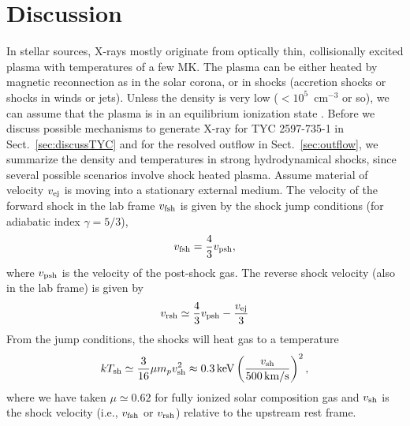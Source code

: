 \documentclass[linenumbers]{aastex631}
\newcommand{\be}{\begin{equation}}
\newcommand{\ee}{\end{equation}}
\begin{document}
\section{Discussion}  \label{sec:discussion}
In stellar sources, X-rays mostly originate from optically thin, collisionally excited plasma with temperatures of a few MK. The plasma can be either heated by magnetic reconnection as in the solar corona, or in shocks (accretion shocks or shocks in winds or jets). Unless the density is very low ($<10^5$~cm$^{-3}$ or so), we can assume that the plasma is in an equilibrium ionization state \citep{2007A&A...466.1111G}.
%
Before we discuss possible mechanisms to generate X-ray for TYC 2597-735-1 in Sect.~\ref{sec:discussTYC} and for the resolved outflow in Sect.~\ref{sec:outflow}, we summarize the density and temperatures in strong hydrodynamical shocks, since several possible scenarios involve shock heated plasma.
Assume material of velocity $v_{\rm ej}$ is moving into a stationary external medium.  The velocity of the forward shock in the lab frame $v_{\rm fsh}$ is given by the shock jump conditions (for adiabatic index $\gamma = 5/3$),
\be
v_{\rm fsh} = \frac{4}{3}v_{\rm psh}, \label{eqn:vsh1}
\ee
where $v_{\rm psh}$ is the velocity of the post-shock gas.  The reverse shock velocity (also in the lab frame) is given by
\be
v_{\rm rsh} \simeq \frac{4}{3}v_{\rm psh} - \frac{v_{\rm ej}}{3}
\label{eqn:vsh2}
\ee
From the jump conditions, the shocks will heat gas to a temperature
\be
kT_{\rm sh} \simeq \frac{3}{16}\mu m_p v_{\rm sh}^{2} \approx 0.3\,{\rm keV}\left(\frac{v_{\rm sh}}{500\,{\rm km/s}}\right)^{2},
\label{eqn:Tshock}
\ee
where we have taken $\mu \simeq 0.62$ for fully ionized solar composition gas and $v_{\rm sh}$ is the shock velocity (i.e., $v_{\rm fsh}$ or $v_{\rm rsh}$) relative to the upstream rest frame.
\end{document}
